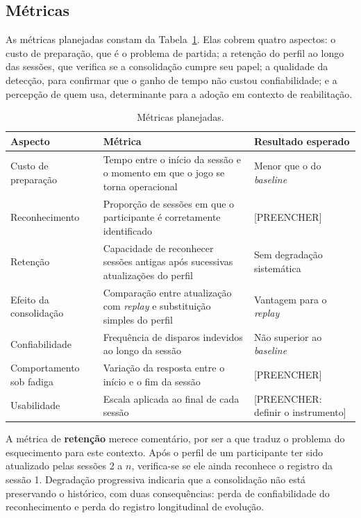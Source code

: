 \subsection{Métricas}

As métricas planejadas constam da Tabela~\ref{tab:metricas}. Elas
cobrem quatro aspectos: o custo de preparação, que é o problema de
partida; a retenção do perfil ao longo das sessões, que verifica se a
consolidação cumpre seu papel; a qualidade da detecção, para confirmar
que o ganho de tempo não custou confiabilidade; e a percepção de quem
usa, determinante para a adoção em contexto de reabilitação.

\begin{table}[htb]
\centering
\caption{Métricas planejadas.}
\label{tab:metricas}
\small
\begin{tabular}{@{}p{3.0cm}p{5.6cm}p{3.4cm}@{}}
\toprule
\textbf{Aspecto} & \textbf{Métrica} & \textbf{Resultado esperado} \\
\midrule
Custo de preparação
& Tempo entre o início da sessão e o momento em que o jogo se torna
operacional
& Menor que o do \textit{baseline} \\
\addlinespace
Reconhecimento
& Proporção de sessões em que o participante é corretamente
identificado
& {[PREENCHER]} \\
\addlinespace
Retenção
& Capacidade de reconhecer sessões antigas após sucessivas
atualizações do perfil
& Sem degradação sistemática \\
\addlinespace
Efeito da consolidação
& Comparação entre atualização com \textit{replay} e substituição
simples do perfil
& Vantagem para o \textit{replay} \\
\addlinespace
Confiabilidade
& Frequência de disparos indevidos ao longo da sessão
& Não superior ao \textit{baseline} \\
\addlinespace
Comportamento sob fadiga
& Variação da resposta entre o início e o fim da sessão
& {[PREENCHER]} \\
\addlinespace
Usabilidade
& Escala aplicada ao final de cada sessão
& {[PREENCHER: definir o instrumento]} \\
\bottomrule
\end{tabular}
\end{table}

A métrica de \textbf{retenção} merece comentário, por ser a que traduz
o problema do esquecimento para este contexto. Após o perfil de um
participante ter sido atualizado pelas sessões 2 a $n$, verifica-se se
ele ainda reconhece o registro da sessão 1. Degradação progressiva
indicaria que a consolidação não está preservando o histórico, com duas
consequências: perda de confiabilidade do reconhecimento e perda do
registro longitudinal de evolução.

